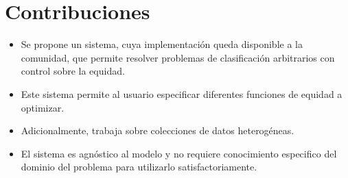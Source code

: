 

\section*{Contribuciones}

\begin{itemize}
    \item Se propone un sistema, cuya implementación queda disponible a la comunidad, que permite resolver problemas de clasificación arbitrarios con control sobre la equidad.
    \item Este sistema permite al usuario especificar diferentes funciones de equidad a optimizar.
    \item Adicionalmente, trabaja sobre colecciones de datos heterogéneas.
    \item El sistema es agnóstico al modelo y no requiere conocimiento especifico del dominio del problema para utilizarlo satisfactoriamente.
\end{itemize}

